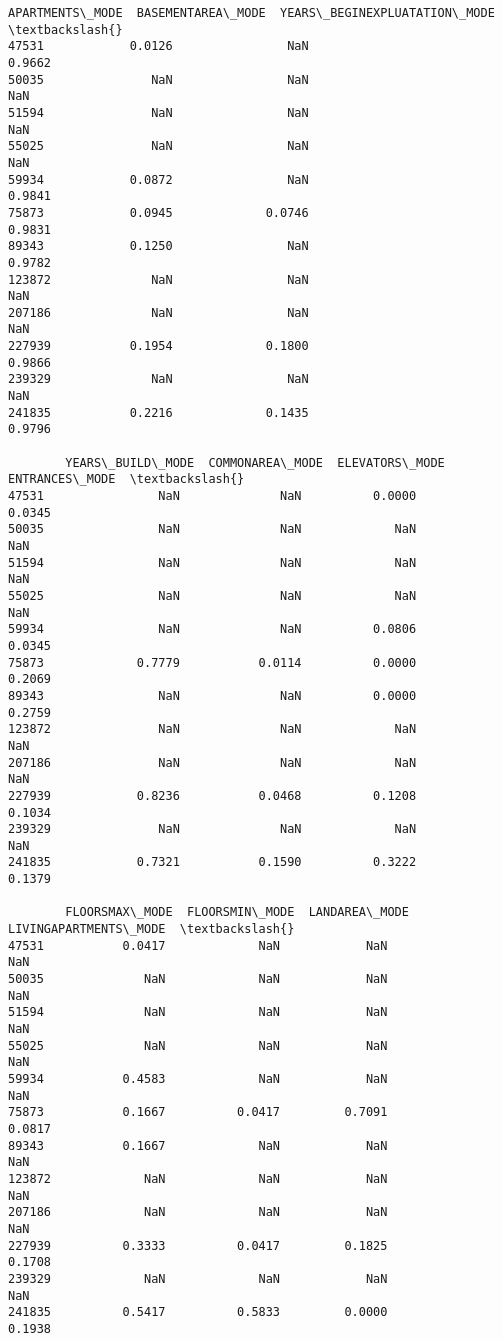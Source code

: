 \documentclass[11pt]{article}
\begin{document}
\begin{tcolorbox}[breakable, size=fbox, boxrule=.5pt, pad at break*=1mm, opacityfill=0]
\begin{Verbatim}[commandchars=\\\{\}]
        APARTMENTS\_MODE  BASEMENTAREA\_MODE  YEARS\_BEGINEXPLUATATION\_MODE  \textbackslash{}
47531            0.0126                NaN                        0.9662
50035               NaN                NaN                           NaN
51594               NaN                NaN                           NaN
55025               NaN                NaN                           NaN
59934            0.0872                NaN                        0.9841
75873            0.0945             0.0746                        0.9831
89343            0.1250                NaN                        0.9782
123872              NaN                NaN                           NaN
207186              NaN                NaN                           NaN
227939           0.1954             0.1800                        0.9866
239329              NaN                NaN                           NaN
241835           0.2216             0.1435                        0.9796

        YEARS\_BUILD\_MODE  COMMONAREA\_MODE  ELEVATORS\_MODE  ENTRANCES\_MODE  \textbackslash{}
47531                NaN              NaN          0.0000          0.0345
50035                NaN              NaN             NaN             NaN
51594                NaN              NaN             NaN             NaN
55025                NaN              NaN             NaN             NaN
59934                NaN              NaN          0.0806          0.0345
75873             0.7779           0.0114          0.0000          0.2069
89343                NaN              NaN          0.0000          0.2759
123872               NaN              NaN             NaN             NaN
207186               NaN              NaN             NaN             NaN
227939            0.8236           0.0468          0.1208          0.1034
239329               NaN              NaN             NaN             NaN
241835            0.7321           0.1590          0.3222          0.1379

        FLOORSMAX\_MODE  FLOORSMIN\_MODE  LANDAREA\_MODE  LIVINGAPARTMENTS\_MODE  \textbackslash{}
47531           0.0417             NaN            NaN                    NaN
50035              NaN             NaN            NaN                    NaN
51594              NaN             NaN            NaN                    NaN
55025              NaN             NaN            NaN                    NaN
59934           0.4583             NaN            NaN                    NaN
75873           0.1667          0.0417         0.7091                 0.0817
89343           0.1667             NaN            NaN                    NaN
123872             NaN             NaN            NaN                    NaN
207186             NaN             NaN            NaN                    NaN
227939          0.3333          0.0417         0.1825                 0.1708
239329             NaN             NaN            NaN                    NaN
241835          0.5417          0.5833         0.0000                 0.1938


\end{Verbatim}
\end{tcolorbox}
\end{document}
